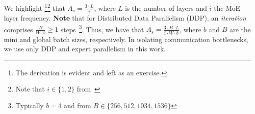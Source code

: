 We highlight
\footnote{The derivation is evident and left as an exercise.}\footnote{Note that $i \in \{1, 2\}$
    from~\cite{DBLP:journals/corr/abs-2101-03961,mixtral8x7B, DBLP:journals/corr/abs-2006-16668}}
that $A_s = \frac{3\cdot L}{i}$, where $L$ is the number of layers and $i$ the MoE layer frequency.
\textbf{Note} that for Distributed Data Parallelism (DDP), an \emph{iteration} comprises $\frac{B}{W\cdot b} \geq 1$
steps~\footnote{Typically $b = 4$ and from
\cite{DBLP:journals/corr/abs-2005-14165} $B \in \{256, 512, 1034, 1536\}$}.
Thus, we have that $A_s = \frac{3 \cdot B\cdot L}{i \cdot W \cdot b}$, where $b$ and $B$ are the mini and global
batch sizes, respectively.
In isolating communication bottlenecks, we use only DDP and expert parallelism in this work.

